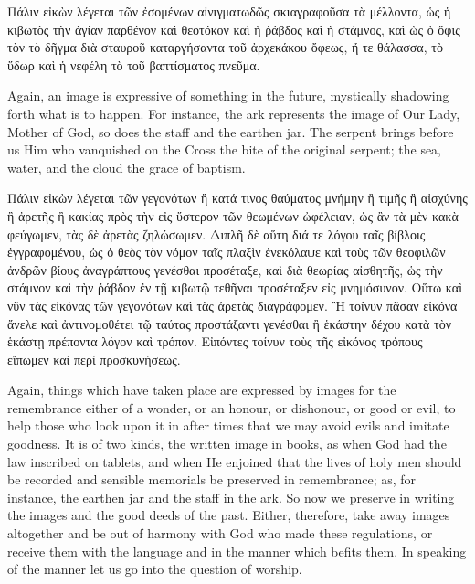 \documentclass[10pt]{book}
\newcommand{\switchgreek}[1][]{\selectlanguage{polutonikogreek} \switchcolumn*[#1]}
\newcommand{\switchenglish}{\selectlanguage{english} \switchcolumn}
\begin{document}
\begin{paracol}{2}
\switchgreek

Πάλιν εἰκὼν λέγεται τῶν ἐσομένων αἰνιγματωδῶς σκιαγραφοῦσα τὰ μέλλοντα, ὡς ἡ κιβωτὸς τὴν ἁγίαν παρθένον καὶ θεοτόκον καὶ ἡ ῥάβδος καὶ ἡ στάμνος, καὶ ὡς ὁ ὄφις τὸν τὸ δῆγμα διὰ σταυροῦ καταργήσαντα τοῦ ἀρχεκάκου ὄφεως, ἥ τε θάλασσα, τὸ ὕδωρ καὶ ἡ νεφέλη τὸ τοῦ βαπτίσματος πνεῦμα.

\switchenglish

Again, an image is expressive of something 
in the future, mystically shadowing forth what 
is to happen. For instance, the ark represents 
the image of Our Lady, Mother of God, so 
does the staff and the earthen jar. The serpent 
brings before us Him who vanquished on the 
Cross the bite of the original serpent; the sea, 
water, and the cloud the grace of baptism. 

\switchgreek

Πάλιν εἰκὼν λέγεται τῶν γεγονότων ἢ κατά τινος θαύματος μνήμην ἢ τιμῆς ἢ αἰσχύνης ἢ ἀρετῆς ἢ κακίας πρὸς τὴν εἰς ὕστερον τῶν θεωμένων ὠφέλειαν, ὡς ἂν τὰ μὲν κακὰ φεύγωμεν, τὰς δὲ ἀρετὰς ζηλώσωμεν. Διπλῆ δὲ αὕτη διά τε λόγου ταῖς βίβλοις ἐγγραφομένου, ὡς ὁ θεὸς τὸν νόμον ταῖς πλαξὶν ἐνεκόλαψε καὶ τοὺς τῶν θεοφιλῶν ἀνδρῶν βίους ἀναγράπτους γενέσθαι προσέταξε, καὶ διὰ θεωρίας αἰσθητῆς, ὡς τὴν στάμνον καὶ τὴν ῥάβδον ἐν τῇ κιβωτῷ τεθῆναι προσέταξεν εἰς μνημόσυνον. Οὕτω καὶ νῦν τὰς εἰκόνας τῶν γεγονότων καὶ τὰς ἀρετὰς διαγράφομεν. Ἢ τοίνυν πᾶσαν εἰκόνα ἄνελε καὶ ἀντινομοθέτει τῷ ταύτας προστάξαντι γενέσθαι ἢ ἑκάστην δέχου κατὰ τὸν ἑκάστῃ πρέποντα λόγον καὶ τρόπον. Εἰπόντες τοίνυν τοὺς τῆς εἰκόνος τρόπους εἴπωμεν καὶ περὶ προσκυνήσεως.

\switchenglish

Again, things which have taken place are 
expressed by images for the remembrance 
either of a wonder, or an honour, or dishonour, 
or good or evil, to help those who look upon 
it in after times that we may avoid evils and 
imitate goodness. It is of two kinds, the 
written image in books, as when God had the 
law inscribed on tablets, and when He enjoined 
that the lives of holy men should be recorded 
and sensible memorials be preserved in remembrance; as, for instance, the earthen jar 
and the staff in the ark. So now we preserve 
in writing the images and the good deeds of 
the past. Either, therefore, take away images 
altogether and be out of harmony with God 
who made these regulations, or receive them 
with the language and in the manner which 
befits them. In speaking of the manner let us 
go into the question of worship. 


\end{paracol}
\end{document}
